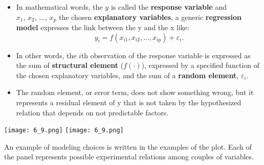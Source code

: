 
\begin{frame} 
  \vspace*{.25cm}
  \begin{itemize}
    \item In mathematical words, the $ y $ is called the \textbf{response variable} and $ x_1,\,x_2,\,\dots,\,x_p $ the chosen \textbf{explanatory variables}, a generic \textbf{regression model} expresses the link between the y and the x like:
      $$ y_i = f(x_{i1}, x_{i2}, \dots, x_{ip}) + \varepsilon_i \mbox{.} $$
    \item In other words, the $i$th observation of the response variable is expressed as the sum of \textbf{structural element} ($ f(\cdot) $), expressed by a specified function of the chosen explanatory variables, and the sum of a \textbf{random element}, $ \varepsilon_i $.
    \item The random element, or error term, does not show something wrong, but it represents a residual element of y that is not taken by the hypothesized relation that depends on not predictable factors.
  \end{itemize}
\end{frame}

\begin{frame}[label = coppie]
  \begin{center}
      {\texttt{[image: 6\_9.png]}}
      {\texttt{[image: 6\_9.png]}}
  \end{center}
  An example of modeling choices is written in the examples of the plot. Each of the panel represents possible experimental relations among couples of variables.  
\end{frame}

